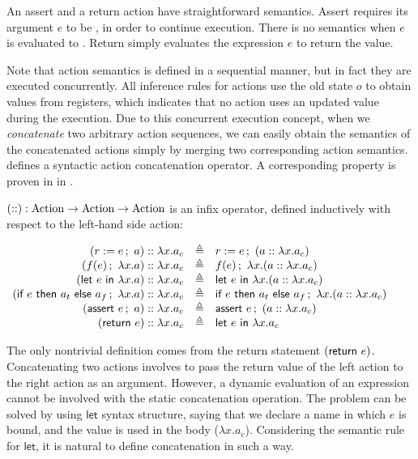An assert and a return action have straightforward semantics. Assert
requires its argument $e$ to be \btrue{}, in order to continue
execution. There is no semantics when $e$ is evaluated to \bfalse{}.
Return simply evaluates the expression $e$ to return the value.

Note that action semantics is defined in a sequential manner, but in
fact they are executed concurrently. All inference rules for actions
use the old state $o$ to obtain values from registers, which indicates
that no action uses an updated value during the execution. Due to this
concurrent execution concept, when we \emph{concatenate} two arbitrary
action sequences, we can easily obtain the semantics of the
concatenated actions simply by merging two corresponding action
semantics.  defines a syntactic action
concatenation operator. A corresponding property is proven in
 in .

\begin{definition}
  \label{def-concataction}
  $(\concatsymb) : \textrm{Action} \to \textrm{Action} \to
  \textrm{Action}$ is an infix operator, defined inductively with
  respect to the left-hand side action:
  \begin{center}
    \begin{math}
      \begin{array}{rcl}
        \concataction{(\actwrite{r}{e}{a})}{a_c} & \triangleq & \actwrite{r}{e}{(\concataction{a}{a_c})} \\
        \concataction{(\actcall{x}{f}{e}{a})}{a_c} & \triangleq & \actcall{x}{f}{e}{(\concataction{a}{a_c})} \\
        \concataction{(\actlet{e}{x}{a})}{a_c} & \triangleq & \actlet{e}{x}{(\concataction{a}{a_c})} \\
        \concataction{(\actifelse{e}{a_t}{a_f}{x}{a})}{a_c} & \triangleq &
        \actifelse{e}{a_t}{a_f}{x}{(\concataction{a}{a_c})} \\
        \concataction{(\actassert{e}{a})}{a_c} & \triangleq & \actassert{e}{(\concataction{a}{a_c})} \\
        \concataction{(\actret{e})}{a_c} & \triangleq & \actlet{e}{x}{a_c} \\
      \end{array}
    \end{math}
  \end{center}
\end{definition}

The only nontrivial definition comes from the return statement
$(\actret{e})$. Concatenating two actions involves to pass the return
value of the left action to the right action as an argument. However,
a dynamic evaluation of an expression cannot be involved with the
static concatenation operation. The problem can be solved by using
$\textsf{let}$ syntax structure, saying that we declare a name in
which $e$ is bound, and the value is used in the body ($\lambda
x.a_c$). Considering the semantic rule for $\textsf{let}$, it is
natural to define concatenation in such a way.

